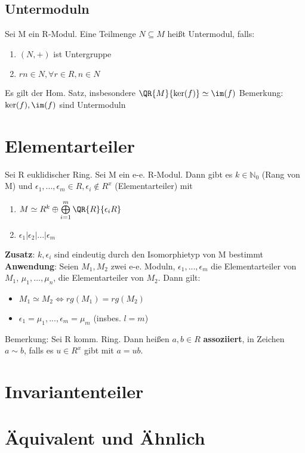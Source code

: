 \subsection{Untermoduln}
Sei M ein R-Modul. Eine Teilmenge $N \subseteq M$ heißt Untermodul, falls:
\begin{enumerate}
	\item $(N,+)$ ist Untergruppe
	\item $rn \in N, \forall r \in R, n\in N$
\end{enumerate}
Es gilt der Hom. Satz, insbesondere $\QR{M}{\ker(f)} \simeq \im(f)$
Bemerkung: $\ker(f),\im(f)$ sind Untermoduln

\section{Elementarteiler}
Sei R euklidischer Ring. Sei M ein e-e. R-Modul. Dann gibt es $k \in \mathbb{N}_0$ (Rang von M) und $\epsilon_1,...,\epsilon_m \in R, \epsilon_i \notin R^x$ (Elementarteiler) mit
\begin{enumerate}
	\item $M \simeq R^k \oplus \bigoplus \limits_{i=1}^m \QR{R}{\epsilon_i R}$
	\item $\epsilon_1 | \epsilon_2 | ... | \epsilon_m$
\end{enumerate}
\textbf{Zusatz}: $k,\epsilon_i$ sind eindeutig durch den Isomorphietyp von M bestimmt\\
\textbf{Anwendung}: Seien $M_1,M_2$ zwei e-e. Moduln, $\epsilon_1,...,\epsilon_m$ die Elementarteiler von $M_1$, $\mu_1,...,\mu_n$, die Elementarteiler von $M_2$. Dann gilt:
\begin{itemize}
	\item $M_1 \simeq M_2 \Leftrightarrow rg(M_1) = rg(M_2)$
	\item $\epsilon_1 = \mu_1,...,\epsilon_m = \mu_m$ (insbes. $l=m$) %
\end{itemize}
Bemerkung: Sei R komm. Ring. Dann heißen $a,b \in R$ \textbf{assoziiert}, in Zeichen $a \sim b$, falls es $u \in R^x$ gibt mit $a=ub$.

\section{Invariantenteiler}

\section{Äquivalent und Ähnlich}
